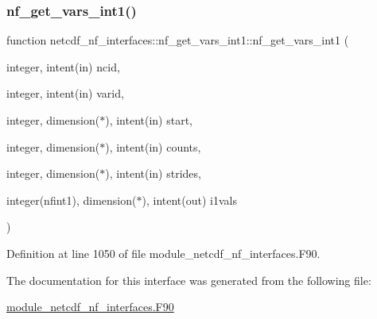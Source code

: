 \subsubsection{\texorpdfstring{nf\+\_\+get\+\_\+vars\+\_\+int1()}{nf\_get\_vars\_int1()}}
{\footnotesize\ttfamily function netcdf\+\_\+nf\+\_\+interfaces\+::nf\+\_\+get\+\_\+vars\+\_\+int1\+::nf\+\_\+get\+\_\+vars\+\_\+int1 (\begin{DoxyParamCaption}\item[{integer, intent(in)}]{ncid,  }\item[{integer, intent(in)}]{varid,  }\item[{integer, dimension($\ast$), intent(in)}]{start,  }\item[{integer, dimension($\ast$), intent(in)}]{counts,  }\item[{integer, dimension($\ast$), intent(in)}]{strides,  }\item[{integer(nfint1), dimension($\ast$), intent(out)}]{i1vals }\end{DoxyParamCaption})}



Definition at line 1050 of file module\+\_\+netcdf\+\_\+nf\+\_\+interfaces.\+F90.



The documentation for this interface was generated from the following file\+:\begin{DoxyCompactItemize}
\item 
\hyperlink{module__netcdf__nf__interfaces_8F90}{module\+\_\+netcdf\+\_\+nf\+\_\+interfaces.\+F90}\end{DoxyCompactItemize}
